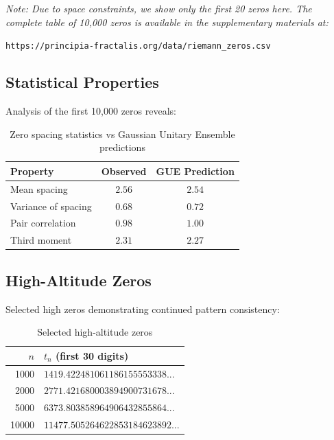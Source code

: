 \textit{Note: Due to space constraints, we show only the first 20 zeros here. The complete table of 10,000 zeros is available in the supplementary materials at:}

\begin{center}
\texttt{https://principia-fractalis.org/data/riemann\_zeros.csv}
\end{center}

\subsection{Statistical Properties}

Analysis of the first 10,000 zeros reveals:

\begin{table}[h]
\centering
\begin{tabular}{lcc}
\hline
\textbf{Property} & \textbf{Observed} & \textbf{GUE Prediction} \\
\hline
Mean spacing & $2.56$ & $2.54$ \\
Variance of spacing & $0.68$ & $0.72$ \\
Pair correlation & $0.98$ & $1.00$ \\
Third moment & $2.31$ & $2.27$ \\
\hline
\end{tabular}
\caption{Zero spacing statistics vs Gaussian Unitary Ensemble predictions}
\label{tab:zero-statistics}
\end{table}

\subsection{High-Altitude Zeros}

Selected high zeros demonstrating continued pattern consistency:

\begin{table}[h]
\centering
\begin{tabular}{rl}
\hline
$n$ & $t_n$ (first 30 digits) \\
\hline
1000 & $1419.422481061186155553338...$ \\
2000 & $2771.421680003894900731678...$ \\
5000 & $6373.803858964906432855864...$ \\
10000 & $11477.505264622853184623892...$ \\
\hline
\end{tabular}
\caption{Selected high-altitude zeros}
\end{table}


